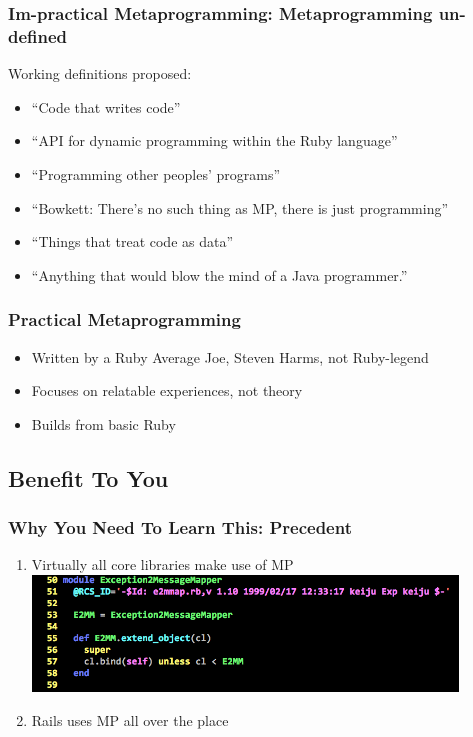 \documentclass[slidestop,compress,mathserif]{beamer}
\begin{document}
\begin{frame}
	\frametitle{\textbf{Im}-practical Metaprogramming:  Metaprogramming \textbf{un}-defined}
	Working definitions proposed:
	\begin{itemize}
		\item ``Code that writes code''
		\pause
		\item ``API for dynamic programming within the Ruby language''
		\pause
		\item ``Programming other peoples' programs''
		\pause
		\item ``Bowkett:  There's no such thing as MP, there is just programming''
		\pause
		\item ``Things that treat code as data''
		\pause
		\item ``Anything that would blow the mind of a Java programmer.''
	\end{itemize}
\end{frame}

\begin{frame}
	\frametitle{Practical Metaprogramming}
	\begin{itemize}
		\pause
		\item Written by a Ruby Average Joe{\texttrademark}, Steven Harms, not Ruby-legend
		\pause
		\item Focuses on relatable experiences, not theory
		\pause
		\item Builds from basic Ruby
	\end{itemize}
\end{frame}

\subsection{Benefit To You} %
\label{sub:benefits}

\begin{frame}
	\frametitle{Why You Need To Learn This:  Precedent}
	\begin{enumerate}
		\item Virtually all core libraries make use of MP
		\pause
		\includegraphics[scale=0.45, width=0.89\textwidth]{img/e2mmap.png}
		\pause
		\item Rails uses MP all over the place
	\end{enumerate}
\end{frame}
\end{document}
